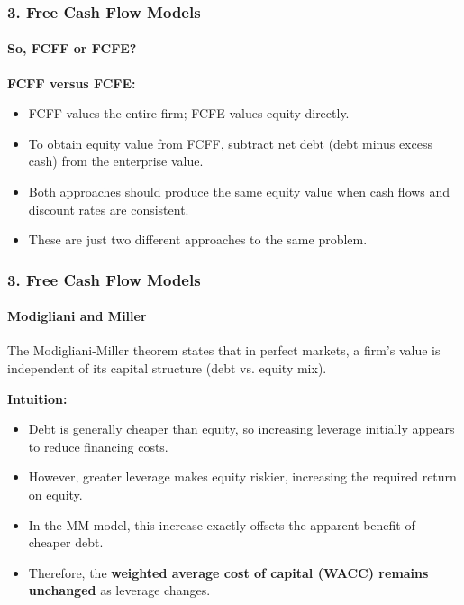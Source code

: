 \documentclass{beamer}
\begin{document}
\begin{frame}[t]
    \frametitle{3. Free Cash Flow Models}
    \framesubtitle{So, FCFF or FCFE?}

    \textbf{FCFF versus FCFE:}

    \begin{itemize}
        \item FCFF values the entire firm; FCFE values equity directly.

        \item To obtain equity value from FCFF, subtract net debt
        (debt minus excess cash) from the enterprise value.

        \item Both approaches should produce the same equity value
        when cash flows and discount rates are consistent.

        \item These are just two different approaches to the same problem.
    \end{itemize}

\end{frame}

\begin{frame}[t]
    \frametitle{3. Free Cash Flow Models}
    \framesubtitle{Modigliani and Miller}

    The Modigliani-Miller theorem states that in perfect markets,
    a firm's value is independent of its capital structure
    (debt vs. equity mix).
    \vspace{1em}

    \textbf{Intuition:}

    \begin{itemize}
        \item Debt is generally cheaper than equity, so increasing
        leverage initially appears to reduce financing costs.

        \item However, greater leverage makes equity riskier,
        increasing the required return on equity.

        \item In the MM model, this increase exactly offsets
        the apparent benefit of cheaper debt.

        \item Therefore, the \textbf{weighted average cost of capital
        (WACC) remains unchanged} as leverage changes.
    \end{itemize}


\end{frame}
\end{document}
